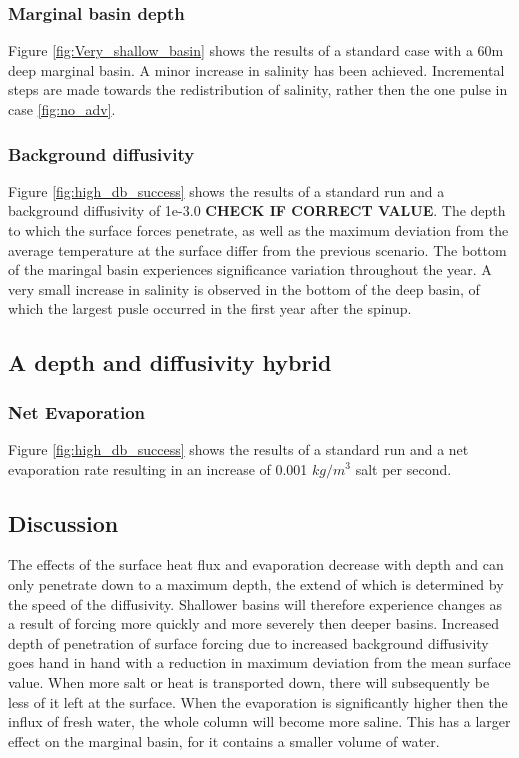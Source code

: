 \documentclass[twocolumn]{article}
\begin{document}
\subsubsection{Marginal basin depth}
\label{sect:mar_basin_depth}
Figure \ref{fig:Very_shallow_basin} shows the results of a standard case with a 60m deep marginal basin. A minor increase in salinity has been achieved. Incremental steps are made towards the redistribution of salinity, rather then the one pulse in case \ref{fig:no_adv}. 


\subsubsection{Background diffusivity}
Figure \ref{fig:high_db_success} shows the results of a standard run and a background diffusivity of 1e-3.0 \textbf{CHECK IF CORRECT VALUE}. The depth to which the surface forces penetrate, as well as the maximum deviation from the average temperature at the surface differ from the previous scenario. The bottom of the maringal basin experiences significance variation throughout the year. A very small increase in salinity is observed in the bottom of the deep basin, of which the largest pusle occurred in the first year after the spinup.

\subsection{A depth and diffusivity hybrid}



\subsubsection{Net Evaporation}
Figure \ref{fig:high_db_success} shows the results of a standard run and a net evaporation rate resulting in an increase of 0.001 $kg/m^3$ salt per second. 

\FloatBarrier
\subsection{Discussion}
The effects of the surface heat flux and evaporation decrease with depth and can only penetrate down to a maximum depth, the extend of which is determined by the speed of the diffusivity. Shallower basins will therefore experience changes as a result of forcing more quickly and more severely then deeper basins. Increased depth of penetration of surface forcing due to increased background diffusivity goes hand in hand with a reduction in maximum deviation from the mean surface value. When more salt or heat is transported down, there will subsequently be less of it left at the surface.
When the evaporation is significantly higher then the influx of fresh water, the whole column will become more saline. This has a larger effect on the marginal basin, for it contains a smaller volume of water.
\end{document}
